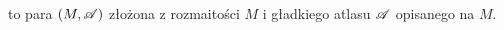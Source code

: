 \begin{definition}
     to para $(M, \mathcal{A})$ złożona z rozmaitości $M$ i gładkiego atlasu $\mathcal{A}$ opisanego na $M$.
\end{definition}
%
%
%
%
%
%
%
%
%
